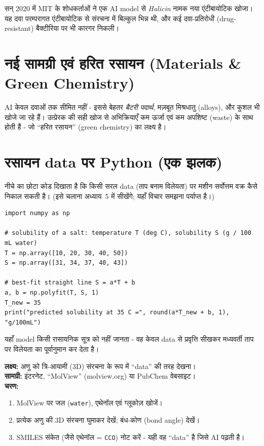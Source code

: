 \begin{jante}
सन् 2020 में MIT के शोधकर्ताओं ने एक AI model से \emph{Halicin} नामक नया एंटीबायोटिक
खोजा। यह दवा परम्परागत एंटीबायोटिक से संरचना में बिल्कुल भिन्न थी, और कई दवा-प्रतिरोधी
(drug-resistant) बैक्टीरिया पर भी कारगर निकली।
\end{jante}

\section{नई सामग्री एवं हरित रसायन (Materials \& Green Chemistry)}

AI केवल दवाओं तक सीमित नहीं - इससे बेहतर \emph{बैटरी पदार्थ}, मज़बूत मिश्रधातु
(alloys), और कुशल  भी खोजे जा रहे हैं। उत्प्रेरक की सही खोज
से अभिक्रियाएँ कम ऊर्जा एवं कम अपशिष्ट (waste) के साथ होती हैं - जो “हरित रसायन”
(green chemistry) का लक्ष्य है।

\section{रसायन data पर Python (एक झलक)}

नीचे का छोटा कोड दिखाता है कि किसी सरल data (ताप बनाम विलेयता) पर मशीन सर्वोत्तम वक्र
कैसे निकाल सकती है। (इसे चलाना अध्याय~5 में सीखेंगे; यहाँ विचार समझना पर्याप्त है।)

\begin{lstlisting}
import numpy as np

# solubility of a salt: temperature T (deg C), solubility S (g / 100 mL water)
T = np.array([10, 20, 30, 40, 50])
S = np.array([31, 34, 37, 40, 43])

# best-fit straight line S = a*T + b
a, b = np.polyfit(T, S, 1)
T_new = 35
print("predicted solubility at 35 C =", round(a*T_new + b, 1), "g/100mL")
\end{lstlisting}

\noindent यहाँ model किसी रासायनिक सूत्र को नहीं जानता - वह केवल data से प्रवृत्ति सीखकर
मध्यवर्ती ताप पर विलेयता का पूर्वानुमान कर देता है।

\begin{gatividhi}[बिना कोड - अणुओं का दृश्य अन्वेषण]
\textbf{लक्ष्य:} अणु को त्रि-आयामी (3D) संरचना के रूप में “data” की तरह देखना।\\[4pt]
\textbf{सामग्री:} इंटरनेट, “MolView” (molview.org) या PubChem वेबसाइट।\\[4pt]
\textbf{चरण:}
\begin{enumerate}[leftmargin=1.6em]
  \item MolView पर जल (\texttt{water}), एथेनॉल एवं ग्लूकोज़ खोजें।
  \item प्रत्येक अणु की 3D संरचना घुमाकर देखें; बंध-कोण (bond angle) देखें।
  \item SMILES संकेत (जैसे एथेनॉल = \texttt{CCO}) नोट करें - यही वह “data” है जिसे
        AI पढ़ती है।
\end{enumerate}
\end{gatividhi}

